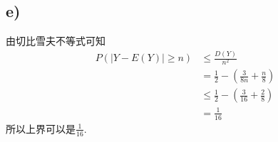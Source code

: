 \documentclass[twocolumn]{article}
\begin{document}
\begin{CJK}{UTF8}{gbsn}
			\subsection*{e)}
				由切比雪夫不等式可知\begin{align*}
					P(|Y-E(Y)|\ge n) & \le \frac{D(Y)}{n^2}\\
					& = \frac{1}{2}-(\frac{3}{8n}+\frac{n}{8})\\
					& \le\frac{1}{2}-(\frac{3}{16}+\frac{2}{8})\\
					& = \frac{1}{16}
				\end{align*}
				所以上界可以是$\frac{1}{16}$.
	\end{CJK}
\end{document}
